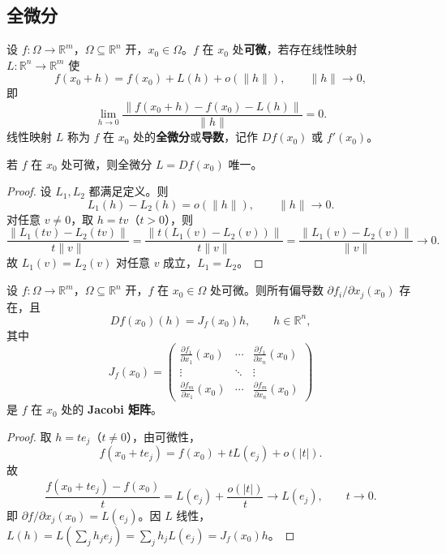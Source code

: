 \subsection{全微分}

\begin{definition}[全微分与可微性]\label{def:total_differential_ra}
设 $f: \Omega \to \mathbb{R}^m$，$\Omega \subseteq \mathbb{R}^n$ 开，$x_0 \in \Omega$。$f$ 在 $x_0$ 处\textbf{可微}，若存在线性映射 $L: \mathbb{R}^n \to \mathbb{R}^m$ 使
\[
f(x_0 + h) = f(x_0) + L(h) + o(\|h\|), \qquad \|h\| \to 0,
\]
即
\[
\lim_{h \to 0} \frac{\|f(x_0 + h) - f(x_0) - L(h)\|}{\|h\|} = 0.
\]
线性映射 $L$ 称为 $f$ 在 $x_0$ 处的\textbf{全微分}或\textbf{导数}，记作 $Df(x_0)$ 或 $f'(x_0)$。
\end{definition}

\begin{proposition}[全微分的唯一性]\label{prop:differential_uniqueness}
若 $f$ 在 $x_0$ 处可微，则全微分 $L = Df(x_0)$ 唯一。
\end{proposition}

\begin{proof}
设 $L_1, L_2$ 都满足定义。则
\[
L_1(h) - L_2(h) = o(\|h\|), \qquad \|h\| \to 0.
\]
对任意 $v \neq 0$，取 $h = t v$（$t > 0$），则
\[
\frac{\|L_1(t v) - L_2(t v)\|}{t \|v\|} = \frac{\|t (L_1(v) - L_2(v))\|}{t \|v\|} = \frac{\|L_1(v) - L_2(v)\|}{\|v\|} \to 0.
\]
故 $L_1(v) = L_2(v)$ 对任意 $v$ 成立，$L_1 = L_2$。
\end{proof}

\begin{theorem}\label{thm:differentiable_jacobian}
设 $f: \Omega \to \mathbb{R}^m$，$\Omega \subseteq \mathbb{R}^n$ 开，$f$ 在 $x_0 \in \Omega$ 处可微。则所有偏导数 $\partial f_i/\partial x_j(x_0)$ 存在，且
\[
Df(x_0)(h) = J_f(x_0) h, \qquad h \in \mathbb{R}^n,
\]
其中
\[
J_f(x_0) = \begin{pmatrix} \frac{\partial f_1}{\partial x_1}(x_0) & \cdots & \frac{\partial f_1}{\partial x_n}(x_0) \\ \vdots & \ddots & \vdots \\ \frac{\partial f_m}{\partial x_1}(x_0) & \cdots & \frac{\partial f_m}{\partial x_n}(x_0) \end{pmatrix}
\]
是 $f$ 在 $x_0$ 处的 \textbf{Jacobi 矩阵}。
\end{theorem}

\begin{proof}
取 $h = t e_j$（$t \neq 0$），由可微性，
\[
f(x_0 + t e_j) = f(x_0) + t L(e_j) + o(|t|).
\]
故
\[
\frac{f(x_0 + t e_j) - f(x_0)}{t} = L(e_j) + \frac{o(|t|)}{t} \to L(e_j), \qquad t \to 0.
\]
即 $\partial f/\partial x_j(x_0) = L(e_j)$。因 $L$ 线性，$L(h) = L(\sum_j h_j e_j) = \sum_j h_j L(e_j) = J_f(x_0) h$。
\end{proof}

